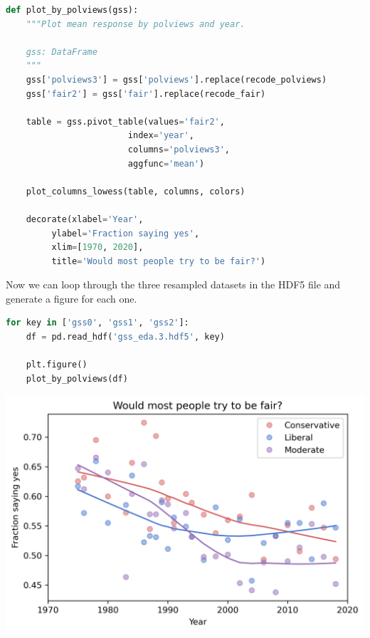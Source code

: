 \begin{lstlisting}[language=Python,style=source]
def plot_by_polviews(gss):
    """Plot mean response by polviews and year.
    
    gss: DataFrame
    """
    gss['polviews3'] = gss['polviews'].replace(recode_polviews)
    gss['fair2'] = gss['fair'].replace(recode_fair)
    
    table = gss.pivot_table(values='fair2', 
                        index='year', 
                        columns='polviews3', 
                        aggfunc='mean')

    plot_columns_lowess(table, columns, colors)

    decorate(xlabel='Year',
         ylabel='Fraction saying yes',
         xlim=[1970, 2020],
         title='Would most people try to be fair?')
\end{lstlisting}

Now we can loop through the three resampled datasets in the HDF5 file
and generate a figure for each one.

\begin{lstlisting}[language=Python,style=source]
for key in ['gss0', 'gss1', 'gss2']:
    df = pd.read_hdf('gss_eda.3.hdf5', key)

    plt.figure()
    plot_by_polviews(df)
\end{lstlisting}

\begin{center}
\includegraphics[scale=0.75]{03_outlook_files/03_outlook_60_0.png}
\end{center}

